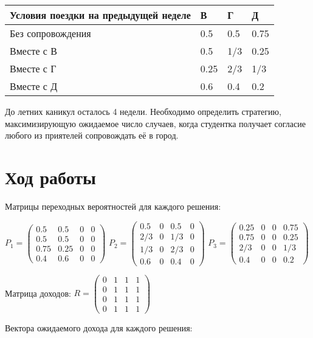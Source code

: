 \documentclass[14pt,a4paper,report]{report}
\begin{document}
\begin{table}[h!]
\begin{tabular}{|l|l|l|l|}
\hline
Условия поездки на предыдущей неделе &   В &   Г  & Д  \\ \hline
Без сопровождения & 0.5 & 0.5 & 0.75 \\ \hline
Вместе с В & 0.5 & 1/3 & 0.25 \\ \hline
 Вместе с Г &  0.25 & 2/3 & 1/3 \\ \hline
 Вместе с Д & 0.6 & 0.4 & 0.2 \\ \hline
\end{tabular}
\end{table}

До летних каникул осталось 4 недели. Необходимо определить стратегию, максимизирующую ожидаемое число случаев, когда студентка получает согласие любого из приятелей сопровождать её в город. 

\section{Ход работы}
Матрицы переходных вероятностей для каждого решения:


$ P_1=
\begin{pmatrix} 
0.5 & 0.5 & 0 & 0 \\
0.5 & 0.5 & 0 & 0\\
0.75 & 0.25 & 0 & 0\\
0.4  & 0.6 & 0 & 0
\end{pmatrix} $
$ P_2=
\begin{pmatrix} 
0.5 & 0 & 0.5 & 0 \\
2/3 & 0 & 1/3 & 0\\
1/3 & 0 & 2/3 & 0\\
0.6  & 0 & 0.4 & 0
\end{pmatrix} $
$ P_3=
\begin{pmatrix} 
0.25 & 0 & 0 & 0.75 \\
0.75 & 0 & 0 & 0.25\\
2/3 & 0 & 0 & 1/3\\
0.4  & 0 & 0 & 0.2
\end{pmatrix} $


Матрица доходов:
$ R =
\begin{pmatrix} 
0 & 1 &1 & 1 \\
0 & 1 & 1 & 1\\
0 & 1 & 1 & 1\\
0  & 1 & 1 & 1
\end{pmatrix} $

Вектора ожидаемого дохода для каждого решения:
\end{document}

